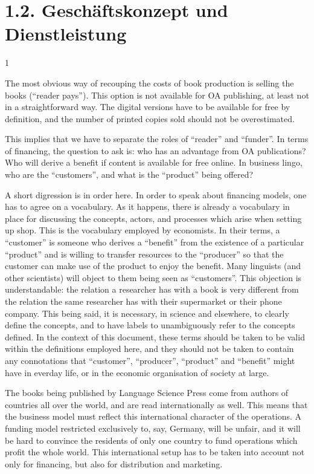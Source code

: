 \documentclass[output=guidelines,draftmode]{langscibook}
\newcommand{\background}[1]{ 
  \vspace{5mm}
  \renewcommand{\tblslinecolour}{lsDarkBlue}
  \tblssy[red]{explore2}{Background}{#1}
}
\newcommand{\langscisolution}[1]{
  \renewcommand{\tblslinecolour}{lsLightBlue}
  \tblssy{langsci}{LangSci solution}{#1}
}
\renewcommand{\tblssy}[4][black!12]{%
  \renewcommand{\langscisymbol}{#2}\renewcommand{\tblsboxcolor}{#1}
  \begin{mdframed}[style=yellowexercise,frametitle={#3}]
    #4
  \end{mdframed}
}
\begin{document}
\section{1.2. Geschäftskonzept und Dienstleistung}

\background{1}
\langscisolution{
The most obvious way of recouping the costs of book production is selling the books (``reader pays''). This option is not available for OA publishing, at least not in a straightforward way. The digital versions have to be available for free by definition, and the number of printed copies sold should not be overestimated. 

This implies that we have to separate the roles of ``reader'' and ``funder''. In terms of financing, the question to ask is: who has an advantage from OA publications? Who will derive a benefit if content is available for free online. In business lingo, who are the ``customers'', and what is the ``product'' being offered? 

A short digression is in order here. In order to speak about financing models, one has to agree on a vocabulary. As it happens, there is already a vocabulary in place for discussing the concepts, actors, and processes which arise when setting up shop. This is the vocabulary employed by economists. In their terms, a ``customer'' is someone who derives a ``benefit'' from the existence of a particular ``product'' and is willing to transfer resources to the ``producer'' so that the customer can make use of the product to enjoy the benefit. Many linguists (and other scientists) will object to them being seen as ``customers''. This objection is understandable: the relation a researcher has with a book is very different from the relation the same researcher has with their supermarket or their phone company. This being said, it is necessary, in science and elsewhere, to clearly define the concepts, and to have labels to unambiguously refer to the concepts defined. In the context of this document, these terms  should be taken to be valid within the definitions employed here, and they should not be taken to contain any connotations that ``customer'', ``producer'', ``product'' and ``benefit'' might have in everday life, or in the economic organisation of society at large. 

The books being published by Language Science Press come from authors of countries all over the world, and are read internationally as well. This means that the business model must reflect this international character of the operations. A funding model restricted exclusively to, say, Germany, will be unfair, and it will be hard to convince the residents of only one country to fund operations which profit the whole world. This international setup has to be taken into account not only for financing, but also for distribution and marketing. 
 
}
\end{document}
